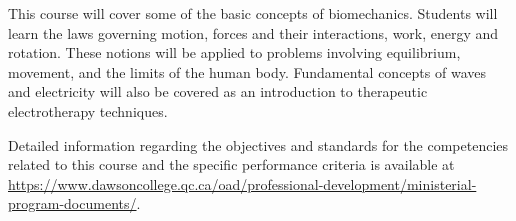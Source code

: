 {This course will cover some of the basic concepts of biomechanics. Students will learn the laws governing motion, forces and their interactions, work, energy and rotation. These notions will be applied to problems involving equilibrium, movement, and the limits of the human body. Fundamental concepts of waves and electricity will also be covered as an introduction to therapeutic electrotherapy techniques.
\smallskip


Detailed information regarding the objectives and standards for the competencies related to this course and the specific performance criteria is available at \url{https://www.dawsoncollege.qc.ca/oad/professional-development/ministerial-program-documents/}.}
